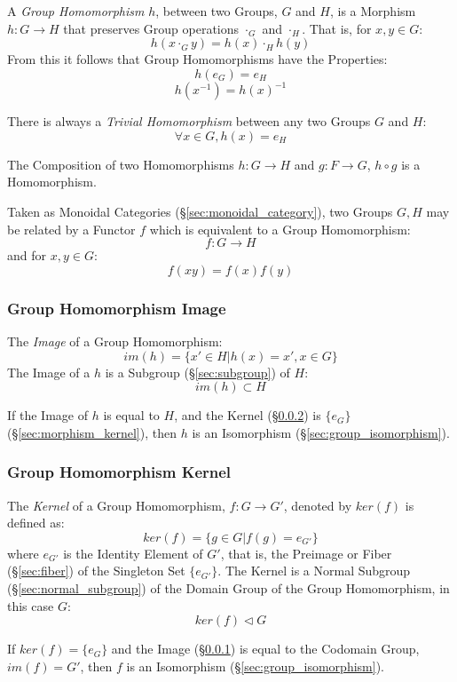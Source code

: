 A \emph{Group Homomorphism} $h$, between two Groups, $G$ and $H$, is a
Morphism $h : G \rightarrow H$ that preserves Group operations
$\cdot_G$ and $\cdot_H$. That is, for $x,y \in G$:
\[
    h(x \cdot_G y) = h(x) \cdot_H h(y)
\]
From this it follows that Group Homomorphisms have the Properties:
\[
    h(e_G) = e_H
\]\[
    h(x^{-1}) = h(x)^{-1}
\]

There is always a \emph{Trivial Homomorphism} between any two Groups
$G$ and $H$:
\[
    \forall x \in G, h (x) = e_H
\]

The Composition of two Homomorphisms $h : G \rightarrow H$ and $g : F
\rightarrow G$, $h \circ g$ is a Homomorphism.

Taken as Monoidal Categories (\S\ref{sec:monoidal_category}), two
Groups $G, H$ may be related by a Functor $f$ which is equivalent to a
Group Homomorphism:
\[
    f : G \rightarrow H
\]
and for $x,y \in G$:
\[
    f(xy) = f(x)f(y)
\]



\subsubsection{Group Homomorphism Image}\label{sec:group_image}

The \emph{Image} of a Group Homomorphism:
\[
    im(h) = \{ x' \in H | h(x) = x', x \in G \}
\]
The Image of a $h$ is a Subgroup (\S\ref{sec:subgroup}) of $H$:
\[
    im(h) \subset H
\]

If the Image of $h$ is equal to $H$, and the Kernel
(\S\ref{sec:group_kernel}) is $\{e_G\}$ (\S\ref{sec:morphism_kernel}),
then $h$ is an Isomorphism (\S\ref{sec:group_isomorphism}).



\subsubsection{Group Homomorphism Kernel}\label{sec:group_kernel}

The \emph{Kernel} of a Group Homomorphism, $f : G \rightarrow G'$,
denoted by $ker(f)$ is defined as:
\[
    ker(f) = \{g \in G | f(g) = e_{G'}\}
\]
where $e_{G'}$ is the Identity Element of $G'$, that is, the Preimage
or Fiber (\S\ref{sec:fiber}) of the Singleton Set $\{e_{G'}\}$. The
Kernel is a Normal Subgroup (\S\ref{sec:normal_subgroup}) of the
Domain Group of the Group Homomorphism, in this case $G$:
\[
    ker(f) \triangleleft G
\]

If $ker(f) = \{e_G\}$ and the Image (\S\ref{sec:group_image}) is equal
to the Codomain Group, $im(f) = G'$, then $f$ is an Isomorphism
(\S\ref{sec:group_isomorphism}).

